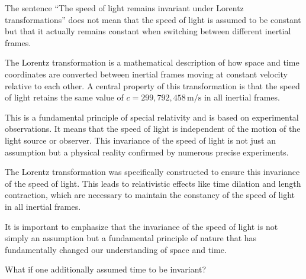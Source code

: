 \documentclass[a4paper,12pt]{article}
\begin{document}
	The sentence ``The speed of light remains invariant under Lorentz transformations'' does not mean that the speed of light is assumed to be constant but that it actually remains constant when switching between different inertial frames.
	
	The Lorentz transformation is a mathematical description of how space and time coordinates are converted between inertial frames moving at constant velocity relative to each other. A central property of this transformation is that the speed of light retains the same value of \( c = 299,792,458 \, \text{m/s} \) in all inertial frames.
	
	This is a fundamental principle of special relativity and is based on experimental observations. It means that the speed of light is independent of the motion of the light source or observer. This invariance of the speed of light is not just an assumption but a physical reality confirmed by numerous precise experiments.
	
	The Lorentz transformation was specifically constructed to ensure this invariance of the speed of light. This leads to relativistic effects like time dilation and length contraction, which are necessary to maintain the constancy of the speed of light in all inertial frames.
	
	It is important to emphasize that the invariance of the speed of light is not simply an assumption but a fundamental principle of nature that has fundamentally changed our understanding of space and time.
	
	What if one additionally assumed time to be invariant?
	
\end{document}
